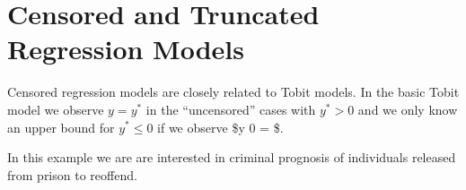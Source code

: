 \documentclass[]{book}
\newenvironment{Shaded}{\begin{snugshade}}{\end{snugshade}}
\newcommand{\CommentTok}[1]{\textcolor[rgb]{0.56,0.35,0.01}{\textit{#1}}}
\newcommand{\DataTypeTok}[1]{\textcolor[rgb]{0.13,0.29,0.53}{#1}}
\newcommand{\DecValTok}[1]{\textcolor[rgb]{0.00,0.00,0.81}{#1}}
\newcommand{\KeywordTok}[1]{\textcolor[rgb]{0.13,0.29,0.53}{\textbf{#1}}}
\newcommand{\NormalTok}[1]{#1}
\newcommand{\OperatorTok}[1]{\textcolor[rgb]{0.81,0.36,0.00}{\textbf{#1}}}
\newcommand{\StringTok}[1]{\textcolor[rgb]{0.31,0.60,0.02}{#1}}
\begin{document}
\hypertarget{censored-and-truncated-regression-models}{%
\section{Censored and Truncated Regression Models}\label{censored-and-truncated-regression-models}}

Censored regression models are closely related to Tobit models. In the basic Tobit model we observe \(y = y^*\) in the ``uncensored'' cases with \(y^* > 0\) and we only know an upper bound for \(y^* \le 0\) if we observe \$y 0 = \$.

In this example we are are interested in criminal prognosis of individuals released from prison to reoffend.

\begin{Shaded}
\end{Shaded}
\end{document}
